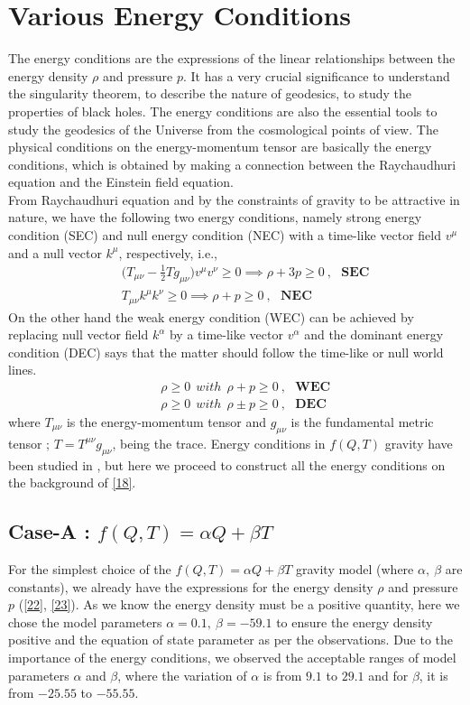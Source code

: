 \documentclass[showpacs,aps,amssymb,preprintnumbers,prd,amsmath,floatfix]{revtex4}
\def \m{\mu}
\def \n{\nu}
\def \a{\alpha}
\def \b{\beta}
\def \ben{\begin{eqnarray}}
\def \een{\end{eqnarray}}
\def \r{\rho}
\begin{document}
\section{Various Energy Conditions}\label{VI}
The energy conditions are the expressions of the linear relationships between the energy density $\r$ and pressure $p$. It has a very crucial significance to understand the singularity theorem, to describe the nature of geodesics, to study the properties of black holes. The energy conditions are also the essential tools to study the geodesics of the Universe from the cosmological points of view. The physical conditions on the energy-momentum tensor are basically the energy conditions, which is obtained by making a connection between the Raychaudhuri equation \cite{Ray1,Ray2,Ray3} and the Einstein field equation.\\
From Raychaudhuri equation and by the constraints of gravity to be attractive in nature, we have the following two energy conditions, namely strong energy condition (SEC) and null energy condition (NEC) with a time-like vector field $v^\m$ and a null vector $k^\m$, respectively, i.e.,
\ben
&&\big(T_{\m\n}-\frac{1}{2}T g_{\m\n}\big)v^\m v^\n\geq 0\implies \r+3p\geq 0~,~~~\textbf{SEC}\label{29}
\\
&& T_{\m\n}k^\m k^\n\geq 0\implies \r+p\geq 0~,~~~\textbf{NEC}\label{30}
\een
On the other hand the weak energy condition (WEC) can be achieved by replacing null vector field $k^\a$ by a time-like vector $v^\a$ and the dominant energy condition (DEC) says that the matter should follow the time-like or null world lines.
\ben
&&\r\geq 0~~with~~\r+p\geq 0~,~~~\textbf{WEC}\label{31}
\\
&&\r\geq 0~~with~~\r\pm p\geq 0~,~~~\textbf{DEC}\label{32}
\een
where $T_{\m\n}$ is the energy-momentum tensor and $g_{\m\n}$ is the fundamental metric tensor ; $T=T^{\m\n}g_{\m\n}$, being the trace. Energy conditions in $f(Q,T)$ gravity have been studied in \cite{Simran1,Simran2}, but here we proceed to construct all the energy conditions on the background of \eqref{18}.



\subsection{Case-A : $f(Q,T)=\a Q+\b T$}
For the simplest choice of the $f(Q,T)=\a Q +\b T$ gravity model (where $\a,~\b$ are constants), we already have the expressions for the energy density $\r$ and pressure $p$ (\eqref{22}, \eqref{23}). As we know the energy density must be a positive quantity, here we chose the model parameters $\a=0.1,~\b=-59.1$ to ensure the energy density positive and the equation of state parameter as per the observations. Due to the importance of the energy conditions, we observed the acceptable ranges of model parameters $\a$ and $\b$, where the variation of $\a$ is from $9.1$ to $29.1$ and for $\b$, it is from $-25.55$ to $-55.55$.
\end{document}
